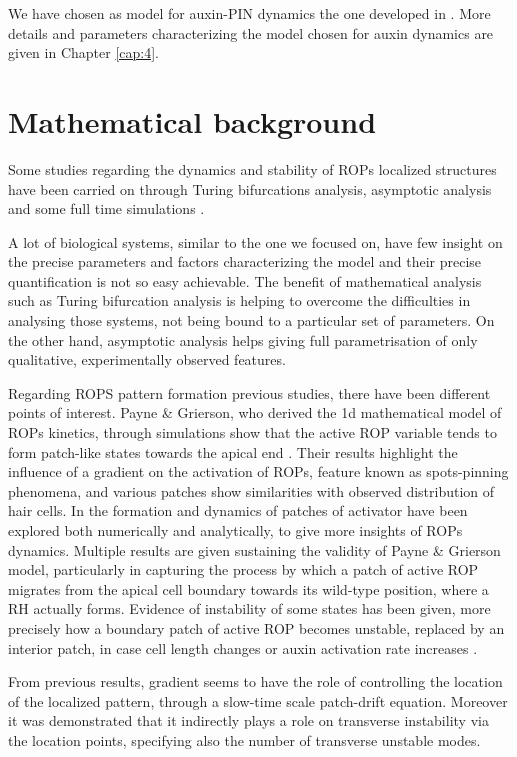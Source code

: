 We have chosen as model for auxin-PIN dynamics the one developed in \cite{plant:Farcot}. More details and parameters characterizing the model chosen for auxin dynamics are given in Chapter \ref{cap:4}.

\section{Mathematical background}
Some studies regarding the dynamics and stability of ROPs localized structures have been carried on through Turing bifurcations analysis, asymptotic analysis and some full time simulations \cite{intra2:14}.

A lot of biological systems, similar to the one we focused on, have few insight on the precise parameters and factors characterizing the model and their precise quantification is not so easy achievable. The benefit of mathematical analysis such as Turing bifurcation analysis is helping to overcome the difficulties in analysing those systems, not being bound to a particular set of parameters. On the other hand, asymptotic analysis helps giving full parametrisation of only qualitative, experimentally observed features.

Regarding ROPS pattern formation previous studies, there have been different points of interest. Payne \& Grierson, who derived the 1d mathematical model of ROPs kinetics, through simulations show that the active ROP variable tends to form patch-like states towards the apical end \cite{payne}. Their results highlight the influence of a gradient on the activation of ROPs, feature known as spots-pinning phenomena, and various patches show similarities with observed distribution of hair cells.
In \cite{phdthesis:victor} the formation and dynamics of patches of activator have been explored both numerically and analytically, to give more insights of ROPs dynamics. Multiple results are given sustaining the validity of Payne \& Grierson model, particularly in capturing the process by which a patch of active ROP migrates from the apical cell boundary towards its wild-type position, where a RH actually forms. Evidence of instability of some states has been given, more precisely how a boundary patch of active ROP becomes unstable, replaced by an interior patch, in case cell length changes or auxin activation rate increases \cite{intra2:26, phdthesis:victor}.

From previous results, gradient seems to have the role of controlling the location of the localized pattern, through a slow-time scale patch-drift equation. Moreover it was demonstrated that it indirectly plays a role on transverse instability via the location points, specifying also the number of transverse unstable modes.


